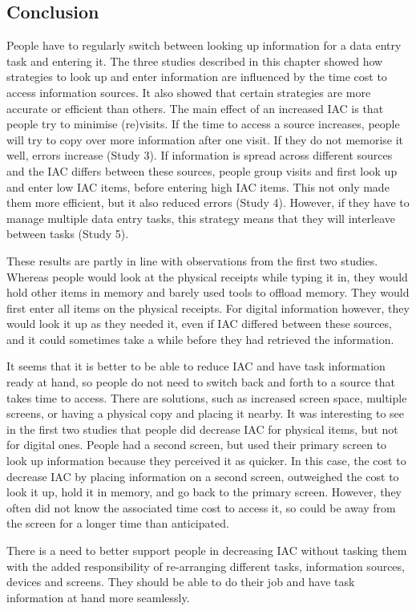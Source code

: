 \subsection{Conclusion}
People have to regularly switch between looking up information for a data entry task and entering it. The three studies described in this chapter showed how strategies to look up and enter information are influenced by the time cost to access information sources. It also showed that certain strategies are more accurate or efficient than others. 
The main effect of an increased IAC is that people try to minimise (re)visits. If the time to access a source increases, people will try to copy over more information after one visit. If they do not memorise it well, errors increase (Study 3).  If information is spread across different sources and the IAC differs between these sources, people group visits and first look up and enter low IAC items, before entering high IAC items. This not only made them more efficient, but it also reduced errors (Study 4). However, if they have to manage multiple data entry tasks, this strategy means that they will interleave between tasks (Study 5).

These results are partly in line with observations from the first two studies. Whereas people would look at the physical receipts while typing it in, they would hold other items in memory and barely used tools to offload memory. They would first enter all items on the physical receipts. For digital information however, they would look it up as they needed it, even if IAC differed between these sources, and it could sometimes take a while before they had retrieved the information.

It seems that it is better to be able to reduce IAC and have task information ready at hand, so people do not need to switch back and forth to a source that takes time to access. There are solutions, such as increased screen space, multiple screens, or having a physical copy and placing it nearby. It was interesting to see in the first two studies that people did decrease IAC for physical items, but not for digital ones. People had a second screen, but used their primary screen to look up information because they perceived it as quicker. In this case, the cost to decrease IAC by placing information on a second screen, outweighed the cost to look it up, hold it in memory, and go back to the primary screen. However, they often did not know the associated time cost to access it, so could be away from the screen for a longer time than anticipated. 

There is a need to better support people in decreasing IAC without tasking them with the added responsibility of re-arranging different tasks, information sources, devices and screens. 
They should be able to do their job and have task information at hand more seamlessly.




